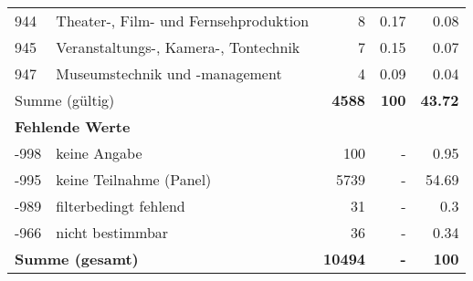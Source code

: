 \begin{longtable}{lXrrr}
        944 & \multicolumn{1}{X}{Theater-, Film- und Fernsehproduktion} & %
          \num{8} &
          \num[round-mode=places,round-precision=2]{0.17} &
          \num[round-mode=places,round-precision=2]{0.08} \\

        945 & \multicolumn{1}{X}{Veranstaltungs-, Kamera-, Tontechnik} & %
          \num{7} &
          \num[round-mode=places,round-precision=2]{0.15} &
          \num[round-mode=places,round-precision=2]{0.07} \\

        947 & \multicolumn{1}{X}{Museumstechnik und -management} & %
          \num{4} &
          \num[round-mode=places,round-precision=2]{0.09} &
          \num[round-mode=places,round-precision=2]{0.04} \\

     \midrule
     \multicolumn{2}{l}{Summe (gültig)} &
       \textbf{\num{4588}} &
     \textbf{\num{100}} &
       \textbf{\num[round-mode=places,round-precision=2]{43.72}} \\
     \multicolumn{5}{l}{\textbf{Fehlende Werte}}\\
       -998 &
       keine Angabe &
         \num{100} &
        - &
         \num[round-mode=places,round-precision=2]{0.95} \\
       -995 &
       keine Teilnahme (Panel) &
         \num{5739} &
        - &
         \num[round-mode=places,round-precision=2]{54.69} \\
       -989 &
       filterbedingt fehlend &
         \num{31} &
        - &
         \num[round-mode=places,round-precision=2]{0.3} \\
       -966 &
       nicht bestimmbar &
         \num{36} &
        - &
         \num[round-mode=places,round-precision=2]{0.34} \\
     \midrule
     \multicolumn{2}{l}{\textbf{Summe (gesamt)}} &
          \textbf{\num{10494}} &
        \textbf{-} &
        \textbf{\num{100}} \\
     \bottomrule
     \end{longtable}
     

